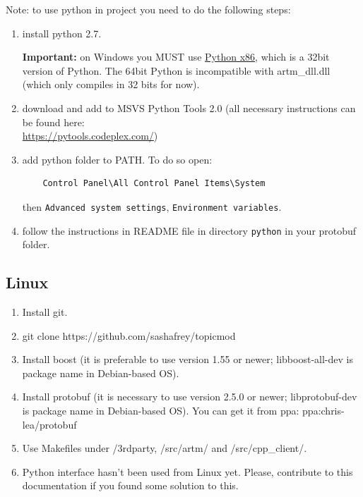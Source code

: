 \documentclass[11pt,a4paper,twoside]{report}
\begin{document}
Note: to use python in project you need to do the following steps:
\begin{enumerate}
	\item install python 2.7.

    {\bf Important:} on Windows you MUST use
    \href{https://www.python.org/ftp/python/2.7.6/python-2.7.6.msi}{Python x86},
    which is a 32bit version of Python. The 64bit Python is incompatible with artm\_dll.dll
    (which only compiles in 32 bits for now).
	\item download and add to MSVS Python Tools 2.0 (all necessary instructions can be found here: \\
	\url{https://pytools.codeplex.com/}) \\
	\item add python folder to PATH. To do so open:
\begin{verbatim}
    Control Panel\All Control Panel Items\System
\end{verbatim}
	then \verb'Advanced system settings', \verb'Environment variables'.
	\item follow the instructions in README file in directory \verb'python' in your protobuf folder.
\end{enumerate}

\subsection{Linux}

\begin{enumerate}
    \item Install git.
    \item git clone https://github.com/sashafrey/topicmod
    \item Install boost (it is preferable to use version 1.55 or newer; \hbox{libboost-all-dev} is package name in Debian-based OS).
    \item Install protobuf (it is necessary to use version 2.5.0 or newer; \hbox{libprotobuf-dev} is package name in Debian-based OS). You can get it from ppa: \hbox{ppa:chris-lea/protobuf}
    \item Use Makefiles under /3rdparty, /src/artm/ and /src/cpp\_client/.
    \item Python interface hasn't been used from Linux yet. Please, contribute to this documentation if you
    found some solution to this.
\end{enumerate}
\end{document}

